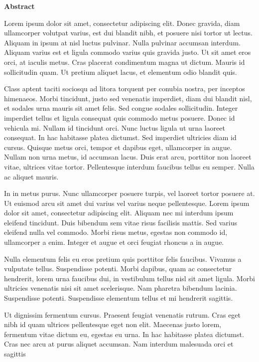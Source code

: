 \begin{headingpage}
\begin{center}\Large \textbf{Abstract}\end{center}

Lorem ipsum dolor sit amet, consectetur adipiscing elit. Donec gravida, diam
ullamcorper volutpat varius, est dui blandit nibh, et posuere nisi tortor ut
lectus. Aliquam in ipsum at nisl luctus pulvinar. Nulla pulvinar accumsan
interdum. Aliquam varius est et ligula commodo varius quis gravida justo. Ut
sit amet eros orci, at iaculis metus. Cras placerat condimentum magna ut
dictum. Mauris id sollicitudin quam. Ut pretium aliquet lacus, et elementum
odio blandit quis.

Class aptent taciti sociosqu ad litora torquent per conubia nostra, per
inceptos himenaeos. Morbi tincidunt, justo sed venenatis imperdiet, diam dui
blandit nisl, et sodales urna mauris sit amet felis. Sed congue sodales
sollicitudin. Integer imperdiet tellus et ligula consequat quis commodo metus
posuere. Donec id vehicula mi. Nullam id tincidunt orci. Nunc luctus ligula ut
urna laoreet consequat. In hac habitasse platea dictumst. Sed imperdiet
ultricies diam id cursus. Quisque metus orci, tempor et dapibus eget,
ullamcorper in augue. Nullam non urna metus, id accumsan lacus. Duis erat
arcu, porttitor non laoreet vitae, ultrices vitae tortor. Pellentesque
interdum faucibus tellus eu semper. Nulla ac aliquet mauris.

In in metus purus. Nunc ullamcorper posuere turpis, vel laoreet tortor posuere
at. Ut euismod arcu sit amet dui varius vel varius neque pellentesque. Lorem
ipsum dolor sit amet, consectetur adipiscing elit. Aliquam nec mi interdum
ipsum eleifend tincidunt. Duis bibendum sem vitae risus facilisis mattis. Sed
varius eleifend nulla vel commodo. Morbi risus metus, egestas non commodo id,
ullamcorper a enim. Integer et augue et orci feugiat rhoncus a in augue.

Nulla elementum felis eu eros pretium quis porttitor felis faucibus. Vivamus a
vulputate tellus. Suspendisse potenti. Morbi dapibus, quam ac consectetur
hendrerit, lorem urna faucibus dui, in vestibulum tellus nisl sit amet ligula.
Morbi ultricies venenatis nisi sit amet scelerisque. Nam pharetra bibendum
lacinia. Suspendisse potenti. Suspendisse elementum tellus et mi hendrerit
sagittis.

Ut dignissim fermentum cursus. Praesent feugiat venenatis rutrum. Cras eget
nibh id quam ultrices pellentesque eget non elit. Maecenas justo lorem,
fermentum vitae dictum eu, egestas eu urna. In hac habitasse platea dictumst.
Cras nec arcu at purus aliquet accumsan. Nam interdum malesuada orci et
sagittis


\end{headingpage}
